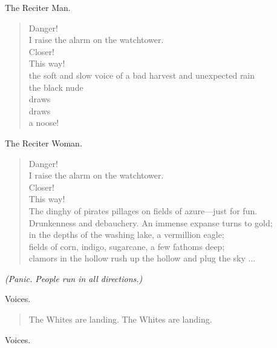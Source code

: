 \documentclass[letterpaper,article,12pt,oneside,notitlepage]{memoir}
\begin{document}
\begin{center}The Reciter Man.\end{center}

\begin{verse}
Danger! \\
I raise the alarm on the watchtower. \\
Closer! \\
This way! \\
the soft and slow voice of a bad harvest and unexpected rain \\
the black nude \\
draws \\
draws \\
a noose! \\
\end{verse}

\begin{center}The Reciter Woman.\end{center}

\begin{verse}
Danger! \\
I raise the alarm on the watchtower. \\
Closer! \\
This way! \\
The dinghy of pirates pillages on fields of azure---just for fun. \\
Drunkenness and debauchery. An immense expanse turns to gold; \\
in the depths of the washing lake, a vermillion eagle; \\
fields of corn, indigo, sugarcane, a few fathoms deep; \\
clamors in the hollow rush up the hollow and plug the sky ... \\
\end{verse}

\textit{(Panic. People run in all directions.)}

\begin{center}Voices.\end{center}

\begin{verse}
The Whites are landing. The Whites are landing. \\
\end{verse}

\clearpage

\begin{center}Voices.\end{center}
\end{document}
